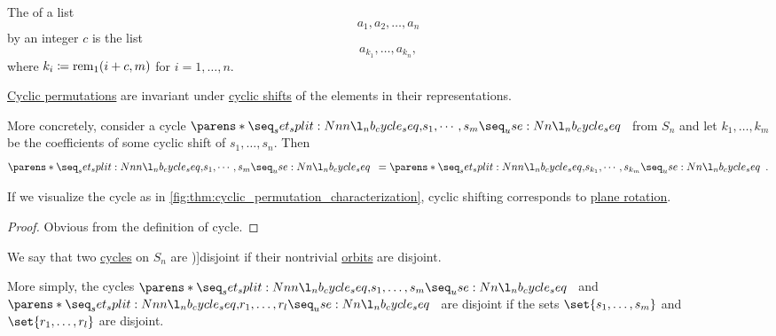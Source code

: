 \begin{definition}\label{def:cyclic_shift}\mimprovised
  The  of a list
  \begin{equation*}
    a_1, a_2, \ldots, a_n
  \end{equation*}
  by an integer \( c \) is the list
  \begin{equation*}
    a_{k_1}, \ldots, a_{k_n},
  \end{equation*}
  where \( k_i \coloneqq \operatorname{rem}_1(i + c, m) \) for \( i = 1, \ldots, n \).
\end{definition}

\begin{proposition}\label{thm:cyclic_permutation_cyclic_shift}
  \hyperref[def:cyclic_permutation]{Cyclic permutations} are invariant under \hyperref[def:cyclic_shift]{cyclic shifts} of the elements in their representations.

  More concretely, consider a cycle \( \cycle{ s_1, \cdots, s_m } \) from \( S_n \) and let \( k_1, \ldots, k_m \) be the coefficients of some cyclic shift of \( s_1, \ldots, s_n \). Then
  \begin{equation*}
    \cycle{ s_1, \cdots, s_m } = \cycle{ s_{k_1}, \cdots, s_{k_m} }.
  \end{equation*}
\end{proposition}
\begin{comments}
  \item If we visualize the cycle as in \cref{fig:thm:cyclic_permutation_characterization}, cyclic shifting corresponds to \hyperref[def:rigid_motion/rotation]{plane rotation}.
\end{comments}
\begin{proof}
  Obvious from the definition of cycle.
\end{proof}

\begin{definition}\label{def:disjoint_cycle}
  We say that two \hyperref[def:cyclic_permutation]{cycles} on \( S_n \) are \term[ru=независимые (\cite[sec. 4.3]{Тыртышников2007ЛинейнаяАлгебра})]{disjoint} if their nontrivial \hyperref[def:group_action_orbit]{orbits} are disjoint.
\end{definition}
\begin{comments}
  \item More simply, the cycles \( \cycle{ s_1, \ldots, s_m } \) and \( \cycle{ r_1, \ldots, r_l } \) are disjoint if the sets \( \set{ s_1, \ldots, s_m } \) and \( \set{ r_1, \ldots, r_l } \) are disjoint.
\end{comments}

